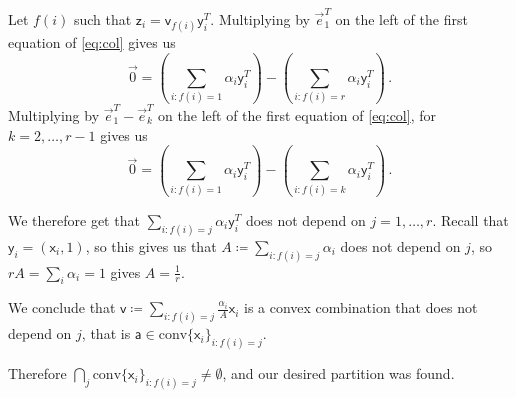 \documentclass[kulak]{tplt}
\theoremstyle{definition}
\newcommand{\vv}{\mathsf{v}}
\newcommand{\vx}{\mathsf{x}}
\newcommand{\vy}{\mathsf{y}}
\newcommand{\vz}{\mathsf{z}}
\newcommand{\va}{\mathsf{a}}
\newcommand{\conv}{\mathrm{conv}}
\begin{document}
\begin{enumerate}
Let $f(i)$ such that $\vz_i = \vv_{f(i)}\vy_i^T$.
Multiplying by $\vec{e}_1^T$ on the left of the first equation of \eqref{eq:col} gives us 
$$ \vec{0} = \left( \sum_{i: f(i) = 1} \alpha_i \vy_i^T\right) - \left(\sum_{i: f(i) = r} \alpha_i \vy_i^T \right) \, . $$
Multiplying by $\vec{e}_1^T - \vec{e}_k^T$ on the left of the first equation of \eqref{eq:col}, for $k = 2, \ldots, r-1$ gives us 
$$ \vec{0} = \left( \sum_{i: f(i) = 1} \alpha_i \vy_i^T\right) - \left(\sum_{i: f(i) = k} \alpha_i \vy_i^T \right) \, . $$

We therefore get that $ \sum_{i: f(i) = j} \alpha_i \vy_i^T$ does not depend on $j = 1, \ldots, r$.
Recall that $\vy_i = (\vx_i, 1)$, so this gives us that $A \coloneqq  \sum_{i: f(i) = j} \alpha_i$ does not depend on $j$, so $r A = \sum_i \alpha_i = 1$ gives $A = \frac{1}{r}$.

We conclude that $\vv \coloneqq \sum_{i: f(i) = j} \frac{\alpha_i}{A}\vx_i$ is a convex combination that does not depend on $j$, that is $\va \in \conv\{\vx_i\}_{i: f(i) = j}$.

Therefore $\bigcap_j \conv\{\vx_i\}_{i: f(i) = j}\neq \emptyset$, and our desired partition was found.



\end{enumerate}
\end{document}
